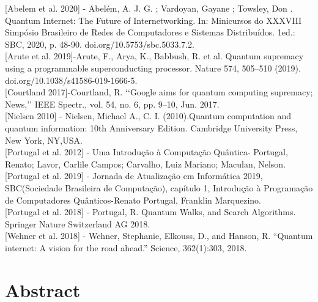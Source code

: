 \documentclass{article}
\begin{document}
    [Abelem et al. 2020] - Abelém, A. J. G. ; Vardoyan, Gayane ; Towsley, Don . Quantum Internet: The Future of Internetworking. In: Minicursos do XXXVIII Simpósio Brasileiro de Redes de Computadores e Sistemas Distribuídos. 1ed.: SBC, 2020, p. 48-90. doi.org/10.5753/sbc.5033.7.2.\\
    
    [Arute et al. 2019]-Arute, F., Arya, K., Babbush, R. et al. Quantum supremacy using a programmable superconducting processor. Nature 574, 505–510 (2019). doi.org/10.1038/s41586-019-1666-5.\\
    
    [Courtland 2017]-Courtland, R. ‘‘Google aims for quantum computing supremacy; News,’’ IEEE Spectr., vol. 54, no. 6, pp. 9–10, Jun. 2017.\\
    
    [Nielsen 2010] - Nielsen, Michael A., C. I. (2010).Quantum computation and quantum information:  10th Anniversary Edition.  Cambridge University Press, New York, NY,USA.\\
    
    [Portugal et al. 2012] - Uma Introdução à Computação Quântica- Portugal, Renato; Lavor, Carlile Campos; Carvalho, Luiz Mariano; Maculan, Nelson.\\
    
    [Portugal et al. 2019] - Jornada de Atualização em Informática 2019, SBC(Sociedade Brasileira de Computação), capítulo 1, Introdução à Programação de Computadores Quânticos-Renato Portugal, Franklin Marquezino.\\

    [Portugal et al. 2018] - Portugal, R. Quantum Walks, and Search Algorithms. Springer Nature Switzerland AG 2018.\\

    [Wehner et al. 2018] - Wehner, Stephanie, Elkouss, D., and Hanson, R. “Quantum internet: A vision for the road ahead.” Science, 362(1):303, 2018.\\


	\section{Abstract}
\end{document}
